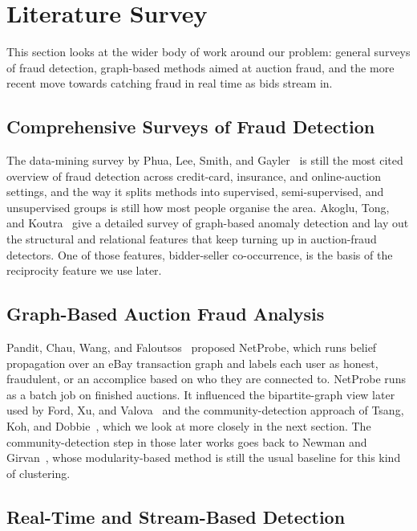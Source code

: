\documentclass[conference]{IEEEtran}
\begin{document}
\section{Literature Survey}

This section looks at the wider body of work around our problem: general
surveys of fraud detection, graph-based methods aimed at auction fraud,
and the more recent move towards catching fraud in real time as bids
stream in.

\subsection{Comprehensive Surveys of Fraud Detection}

The data-mining survey by Phua, Lee, Smith, and Gayler~\cite{Phua2010} is
still the most cited overview of fraud detection across credit-card,
insurance, and online-auction settings, and the way it splits methods
into supervised, semi-supervised, and unsupervised groups is still how
most people organise the area. Akoglu, Tong, and Koutra~\cite{Akoglu2015}
give a detailed survey of graph-based anomaly detection and lay out the
structural and relational features that keep turning up in auction-fraud
detectors. One of those features, bidder-seller co-occurrence, is the
basis of the reciprocity feature we use later.

\subsection{Graph-Based Auction Fraud Analysis}

Pandit, Chau, Wang, and Faloutsos~\cite{Pandit2007} proposed NetProbe,
which runs belief propagation over an eBay transaction graph and labels
each user as honest, fraudulent, or an accomplice based on who they are
connected to. NetProbe runs as a batch job on finished auctions. It
influenced the bipartite-graph view later used by Ford, Xu, and
Valova~\cite{Ford2010} and the community-detection approach of Tsang,
Koh, and Dobbie~\cite{Tsang2014}, which we look at more closely in the
next section. The community-detection step in those later works goes back
to Newman and Girvan~\cite{Newman2004}, whose modularity-based method is
still the usual baseline for this kind of clustering.

\subsection{Real-Time and Stream-Based Detection}
\end{document}
